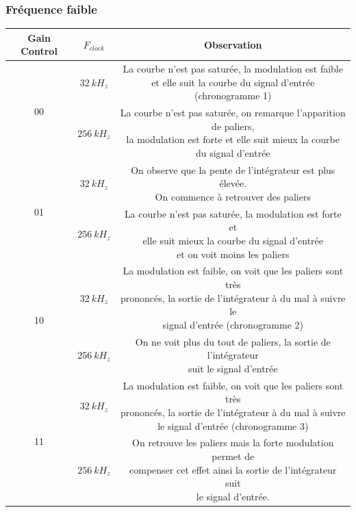 \documentclass[11pt, openright]{book}
\begin{document}
\subsubsection{Fréquence faible}

\begin{center}
    \begin{tabular}{c|c|c}
        Gain Control        & $F_{clock}$ & Observation                                                                 \\
        \hline
        \multirow{2}{*}{00} & $32\ kH_z$  & \makecell{La courbe n’est pas saturée, la modulation est faible             \\ et elle suit la courbe du signal d’entrée (chronogramme 1)}\\
        \cline{2-3}
                            & $256\ kH_z$ & \makecell{La courbe n’est pas saturée, on remarque l'apparition de paliers, \\ la modulation est forte et elle suit mieux la courbe\\ du signal d’entrée}\\
        \hline
        \multirow{2}{*}{01} & $32\ kH_z$  & \makecell{On observe que la pente de l'intégrateur est plus élevée.         \\ On commence à retrouver des paliers}\\
        \cline{2-3}
                            & $256\ kH_z$ & \makecell{La courbe n’est pas saturée, la modulation est forte et           \\ elle suit mieux la courbe du signal d’entrée\\ et on voit moins les paliers}\\
        \hline
        \multirow{2}{*}{10} & $32\ kH_z$  & \makecell{La modulation est faible, on voit que les paliers sont très       \\ prononcés, la sortie de l'intégrateur à du mal à suivre le\\ signal d'entrée (chronogramme 2)}\\
        \cline{2-3}
                            & $256\ kH_z$ & \makecell{On ne voit plus du tout de paliers, la sortie de l'intégrateur    \\ suit le signal d'entrée} \\
        \hline
        \multirow{2}{*}{11} & $32\ kH_z$  & \makecell{La modulation est faible, on voit que les paliers sont très       \\ prononcés, la sortie de l'intégrateur à du mal à suivre\\ le signal d'entrée (chronogramme 3)}\\
        \cline{2-3}
                            & $256\ kH_z$ & \makecell{On retrouve les paliers mais la forte modulation permet de        \\ compenser cet effet ainsi la sortie de l’intégrateur suit\\ le signal d’entrée.} \\
    \end{tabular}
\end{center}
\end{document}
